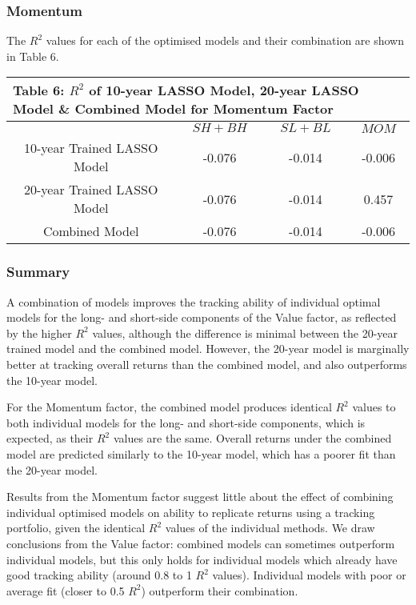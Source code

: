 \documentclass[AER]{AEA}
\begin{document}
\begin{spacing}{2}
\subsubsection{Momentum}

The \(R^2\) values for each of the optimised models and their combination are shown in Table 6.

\begin{spacing}{1}
\begin{table}[H]
    \centering
    \begin{tabular}{|c|c|c|c|}
    \multicolumn{4}{l}{\textbf{Table 6: \(R^2\) of 10-year LASSO Model, 20-year LASSO Model \& Combined Model for Momentum Factor}}\\
    \hline
    & $SH+BH$ & $SL+BL$ & $MOM$ \\
     \hline
    10-year Trained LASSO Model & -0.076 & -0.014 & -0.006 \\
    \hline
    20-year Trained LASSO Model & -0.076 & -0.014 & 0.457 \\
    \hline
    Combined Model & -0.076 & -0.014 & -0.006 \\
    \hline
    \end{tabular}
\end{table}
\end{spacing}

\subsubsection{Summary}

A combination of models improves the tracking ability of individual optimal models for the long- and short-side components of the Value factor, as reflected by the higher \(R^2\) values, although the difference is minimal between the 20-year trained model and the combined model. However, the 20-year model is marginally better at tracking overall returns than the combined model, and also outperforms the 10-year model.

For the Momentum factor, the combined model produces identical \(R^2\) values to both individual models for the long- and short-side components, which is expected, as their \(R^2\) values are the same. Overall returns under the combined model are predicted similarly to the 10-year model, which has a poorer fit than the 20-year model.

Results from the Momentum factor suggest little about the effect of combining individual optimised models on ability to replicate returns using a tracking portfolio, given the identical \(R^2\) values of the individual methods. We draw conclusions from the Value factor: combined models can sometimes outperform individual models, but this only holds for individual models which already have good tracking ability (around 0.8 to 1 \(R^2\) values). Individual models with poor or average fit (closer to 0.5 \(R^2\)) outperform their combination.

\newpage

\printbibliography
\end{spacing}
\end{document}
